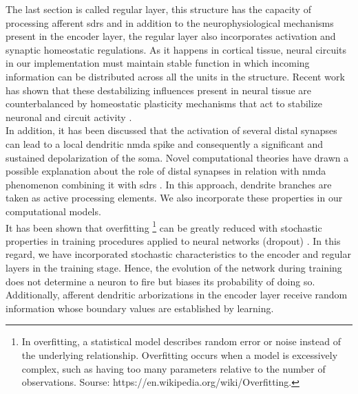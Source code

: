 \documentclass[11pt,a4paper]{article}
\begin{document}
The last section is called regular layer, this structure has the capacity of
processing afferent \glspl{sdr} and in addition to the neurophysiological
mechanisms present in the encoder layer, the regular layer also incorporates
activation and synaptic homeostatic regulations.
As it happens in cortical tissue, neural circuits in our implementation
must maintain stable function in which incoming information can be distributed
across all the units in the structure.
Recent work has shown that these destabilizing influences present in neural tissue
are counterbalanced
by homeostatic plasticity mechanisms that act to stabilize neuronal
and circuit activity \cite{turrigiano_2012}. \\

In addition, it has been discussed 
that the activation of several distal
synapses can lead to a local dendritic \gls{nmda}
spike and consequently a significant
and sustained depolarization of the soma.
Novel computational theories have drawn a possible explanation
about the role of distal synapses in relation with \gls{nmda}
phenomenon \cite{hawkins_2016}
combining it with \glspl{sdr} \cite{ahmad_2016}.
In this approach, dendrite branches are taken as active processing elements.
We also incorporate these properties in our computational models. \\

It has been shown that overfitting
\footnote{In overfitting, a statistical model describes random error or noise instead of the underlying relationship. %
Overfitting occurs when a model is excessively complex, such as having too many parameters relative to the number of observations. %
Sourse: https://en.wikipedia.org/wiki/Overfitting.}
can be greatly reduced with
stochastic properties in training procedures
applied to neural networks (dropout) \cite{JMLR:v15:srivastava14a}.
In this regard, we have incorporated stochastic characteristics to
the encoder and regular layers in the training stage.
Hence, the evolution of the network during training does not
determine a neuron to fire but biases its probability
of doing so. Additionally, afferent dendritic arborizations
in the encoder layer receive random information whose
boundary values are established by learning. \\












\end{document}
